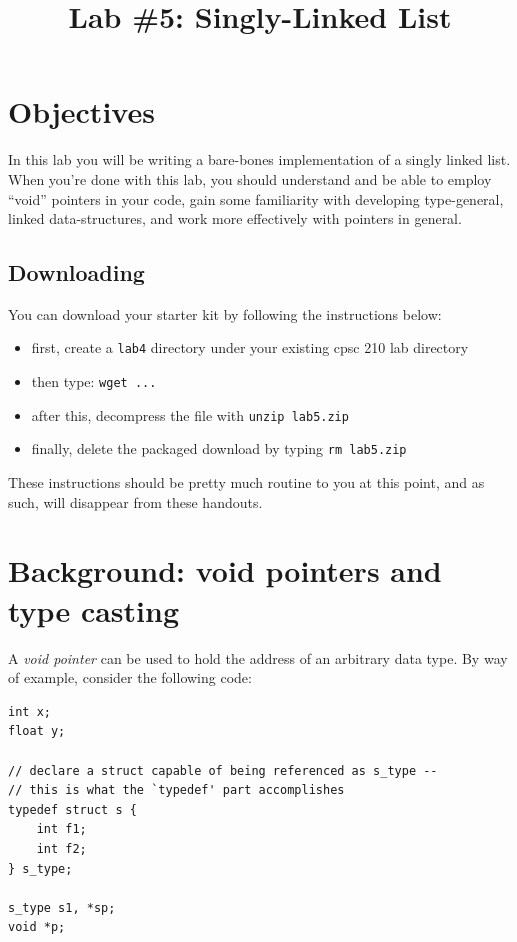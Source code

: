 \documentclass[12pt]{article}
\begin{document}
\title{\vspace{-.35in}Lab \#5: Singly-Linked List}
\date{\empty}
\maketitle

\pagestyle{fancy}
\thispagestyle{fancy}

\vspace{-.75in}
\section{Objectives}
In this lab you will be writing a bare-bones implementation of a singly linked list. When you're done with this lab, you should understand and be able to employ ``void'' pointers in your code, gain some familiarity with developing type-general, linked data-structures, and work more effectively with pointers in general.

\subsection{Downloading}

You can download your starter kit by following the instructions below:

\begin{itemize}
\item first, create a \texttt{lab4} directory under your existing cpsc 210 lab directory 
\item then type: \texttt{wget ...}
\item after this, decompress the file with \texttt{unzip lab5.zip}
\item finally, delete the packaged download by typing \texttt{rm lab5.zip}
\end{itemize}

These instructions should be pretty much routine to you at this point, and as such, will disappear from these handouts.

\section{Background: void pointers and type casting}

A \textit{void pointer} can be used to hold the address of an arbitrary data type. By way of example, consider the following code:

\begin{mdframed}[backgroundcolor=light-gray, innerleftmargin=10, innertopmargin=1,innerbottommargin=1,linecolor=light-gray]
\begin{lstlisting}
int x;
float y;

// declare a struct capable of being referenced as s_type --
// this is what the `typedef' part accomplishes
typedef struct s {
    int f1;
    int f2;
} s_type;

s_type s1, *sp;
void *p;
\end{lstlisting}
\end{mdframed}
\end{document}
